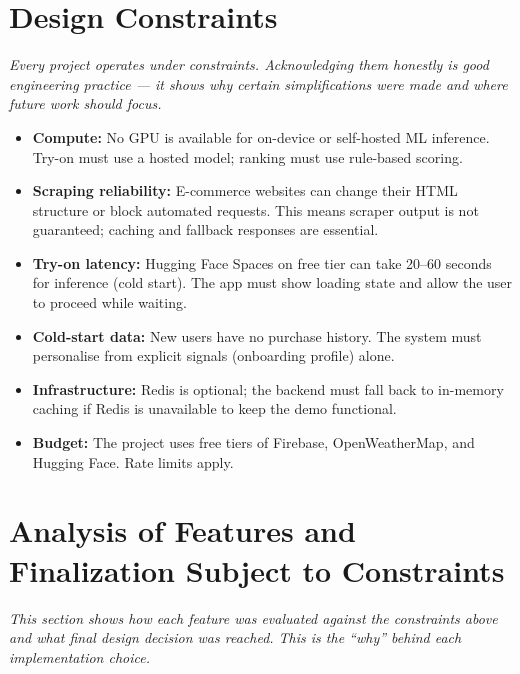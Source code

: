 \documentclass[12pt,a4paper]{report}
\begin{document}
\section{Design Constraints}

\textit{Every project operates under constraints. Acknowledging them honestly is good engineering practice --- it shows why certain simplifications were made and where future work should focus.}

\begin{itemize}
  \item \textbf{Compute:} No GPU is available for on-device or self-hosted ML inference. Try-on must use a hosted model; ranking must use rule-based scoring.
  \item \textbf{Scraping reliability:} E-commerce websites can change their HTML structure or block automated requests. This means scraper output is not guaranteed; caching and fallback responses are essential.
  \item \textbf{Try-on latency:} Hugging Face Spaces on free tier can take 20--60 seconds for inference (cold start). The app must show loading state and allow the user to proceed while waiting.
  \item \textbf{Cold-start data:} New users have no purchase history. The system must personalise from explicit signals (onboarding profile) alone.
  \item \textbf{Infrastructure:} Redis is optional; the backend must fall back to in-memory caching if Redis is unavailable to keep the demo functional.
  \item \textbf{Budget:} The project uses free tiers of Firebase, OpenWeatherMap, and Hugging Face. Rate limits apply.
\end{itemize}

\section{Analysis of Features and Finalization Subject to Constraints}

\textit{This section shows how each feature was evaluated against the constraints above and what final design decision was reached. This is the ``why'' behind each implementation choice.}
\end{document}
